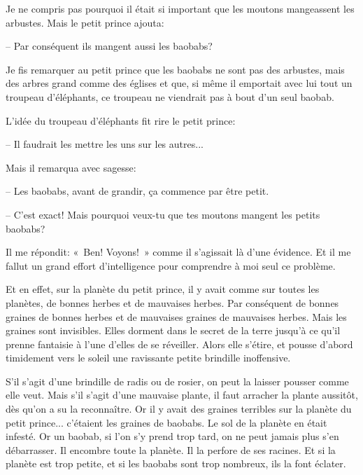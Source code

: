 \documentclass[a4paper]{report}
\begin{document}
Je ne compris pas pourquoi il était si important que les moutons mangeassent les arbustes. Mais le petit prince ajouta:

-- Par conséquent ils mangent aussi les baobabs?

Je fis remarquer au petit prince que les baobabs ne sont pas des arbustes, mais des arbres grand comme des églises et que, si même il emportait avec lui tout un troupeau d'éléphants, ce troupeau ne viendrait pas à bout d'un seul baobab.

L'idée du troupeau d'éléphants fit rire le petit prince:

-- Il faudrait les mettre les uns sur les autres...

Mais il remarqua avec sagesse:


-- Les baobabs, avant de grandir, ça commence par être petit.

-- C'est exact! Mais pourquoi veux-tu que tes moutons mangent les petits baobabs?

Il me répondit: «~Ben! Voyons!~» comme il s'agissait là d'une évidence. Et il me fallut un grand effort d'intelligence pour comprendre à moi seul ce problème.

Et en effet, sur la planète du petit prince, il y avait comme sur toutes les planètes, de bonnes herbes et de mauvaises herbes. Par conséquent de bonnes graines de bonnes herbes et de mauvaises graines de mauvaises herbes. Mais les graines sont invisibles. Elles dorment dans le secret de la terre jusqu'à ce qu'il prenne fantaisie à l'une d'elles de se réveiller. Alors elle s'étire, et pousse d'abord timidement vers le soleil une ravissante petite brindille inoffensive.

S'il s'agit d'une brindille de radis ou de rosier, on peut la laisser pousser comme elle veut. Mais s'il s'agit d'une mauvaise plante, il faut arracher la plante aussitôt, dès qu'on a su la reconnaître. Or il y avait des graines terribles sur la planète du petit prince... c'étaient les graines de baobabs. Le sol de la planète en était infesté. Or un baobab, si l'on s'y prend trop tard, on ne peut jamais plus s'en débarrasser. Il encombre toute la planète. Il la perfore de ses racines. Et si la planète est trop petite, et si les baobabs sont trop nombreux, ils la font éclater.
\end{document}

